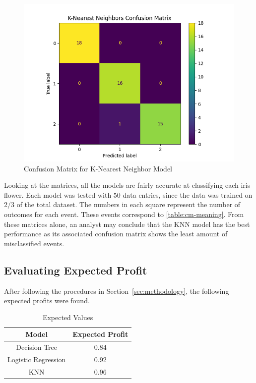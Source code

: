 \documentclass[journal]{IEEEtran}
\begin{document}
\begin{figure}[h!]
\includegraphics[scale=.5]{knn_cm.png}
\centering
\caption{Confusion Matrix for K-Nearest Neighbor Model}
\label{fig:cm-knn}
\end{figure}

Looking at the matrices, all the models are fairly accurate at classifying each iris flower. Each model was tested with 50 data entries, since the data was trained on 2/3 of the total dataset. The numbers in each square represent the number of outcomes for each event. These events correspond to \ref{table:cm-meaning}. From these matrices alone, an analyst may conclude that the KNN model has the best performance as its associated confusion matrix shows the least amount of misclassified events. 

\subsection{Evaluating Expected Profit}

After following the procedures in Section~\ref{sec:methodology}, the following expected profits were found. 

\begin{table}[h!]
\centering
\begin{tabular}{ c | c }
Model & Expected Profit \\
\hline
Decision Tree & 0.84 \\
Logistic Regression & 0.92 \\
KNN & 0.96
\end{tabular}
\caption{Expected Values}
\label{table:exVals}
\end{table}
\end{document}
